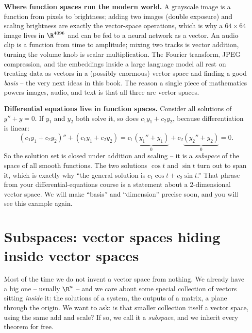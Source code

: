 \begin{applicationbox}
\textbf{Where function spaces run the modern world.} A grayscale image is a function from
pixels to brightness; adding two images (double exposure) and scaling brightness are
exactly the vector-space operations, which is why a $64\times 64$ image lives in
$\R^{4096}$ and can be fed to a neural network as a vector. An audio clip is a function
from time to amplitude; mixing two tracks is vector addition, turning the volume knob is
scalar multiplication. The Fourier transform, JPEG compression, and the embeddings inside
a large language model all rest on treating data as vectors in a (possibly enormous)
vector space and finding a good \emph{basis} -- the very next ideas in this book. The
reason a single piece of mathematics powers images, audio, and text is that all three are
vector spaces.
\end{applicationbox}

\begin{connectionbox}
\textbf{Differential equations live in function spaces.} Consider all solutions of
$y'' + y = 0$. If $y_1$ and $y_2$ both solve it, so does $c_1 y_1 + c_2 y_2$, because
differentiation is linear:
\[
(c_1 y_1 + c_2 y_2)'' + (c_1 y_1 + c_2 y_2)
= c_1\underbrace{(y_1'' + y_1)}_{0} + c_2\underbrace{(y_2'' + y_2)}_{0} = 0.
\]
So the solution set is closed under addition and scaling -- it is a \emph{subspace} of the
space of all smooth functions. The two solutions $\cos t$ and $\sin t$ turn out to span
it, which is exactly why ``the general solution is $c_1\cos t + c_2\sin t$.'' That phrase
from your differential-equations course is a statement about a $2$-dimensional vector
space. We will make ``basis'' and ``dimension'' precise soon, and you will see this
example again.
\end{connectionbox}

\section{Subspaces: vector spaces hiding inside vector spaces}

Most of the time we do not invent a vector space from nothing. We already have a big one
-- usually $\R^n$ -- and we care about some special collection of vectors sitting
\emph{inside} it: the solutions of a system, the outputs of a matrix, a plane through the
origin. We want to ask: is that smaller collection itself a vector space, using the same
add and scale? If so, we call it a \emph{subspace}, and we inherit every theorem for free.

